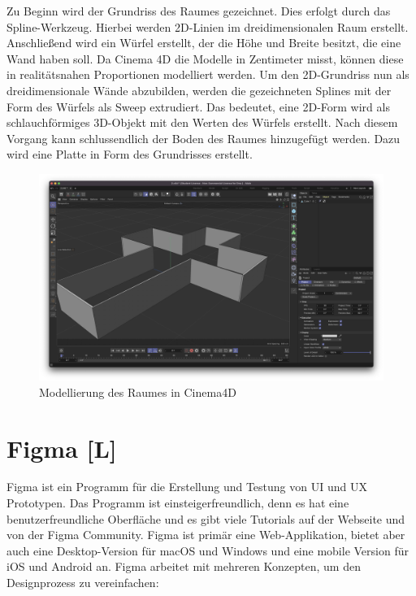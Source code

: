 Zu Beginn wird der Grundriss des Raumes gezeichnet. Dies erfolgt durch das Spline-Werkzeug. Hierbei werden 2D-Linien im dreidimensionalen Raum erstellt. Anschließend wird ein Würfel erstellt, der die Höhe und Breite besitzt, die eine Wand haben soll. Da Cinema 4D die Modelle in Zentimeter misst, können diese in realitätsnahen Proportionen modelliert werden. Um den 2D-Grundriss nun als dreidimensionale Wände abzubilden, werden die gezeichneten Splines mit der Form des Würfels als Sweep extrudiert. Das bedeutet, eine 2D-Form wird als schlauchförmiges 3D-Objekt mit den Werten des Würfels erstellt. Nach diesem Vorgang kann schlussendlich der Boden des Raumes hinzugefügt werden. Dazu wird eine Platte in Form des Grundrisses erstellt. 

\begin{figure} [h t]
    \centering
    \includegraphics[scale=0.2]{pics/Room-model.png}
    \caption{Modellierung des Raumes in Cinema4D}
    \label{fig:tech:front:room-model}
  \end{figure}



\section{Figma [L]}
\label{ch::technologies::figma}
Figma ist ein Programm für die Erstellung und Testung von UI und UX Prototypen. Das Programm ist einsteigerfreundlich, denn es hat eine benutzerfreundliche Oberfläche und es gibt viele Tutorials auf der Webseite und von der Figma Community. Figma ist primär eine Web-Applikation, bietet aber auch eine Desktop-Version für macOS und Windows und eine mobile Version für iOS und Android an. Figma arbeitet mit mehreren Konzepten, um den Designprozess zu vereinfachen:
